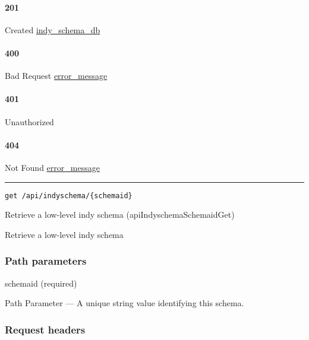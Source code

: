 \hypertarget{section-147}{%
\paragraph{201}\label{section-147}}

Created \protect\hyperlink{indy_schema_db}{indy\_schema\_db}

\hypertarget{section-148}{%
\paragraph{400}\label{section-148}}

Bad Request \protect\hyperlink{error_message}{error\_message}

\hypertarget{section-149}{%
\paragraph{401}\label{section-149}}

Unauthorized \protect\hyperlink{}{}

\hypertarget{section-150}{%
\paragraph{404}\label{section-150}}

Not Found \protect\hyperlink{error_message}{error\_message}

\begin{center}\rule{0.5\linewidth}{\linethickness}\end{center}

\protect\hypertarget{apiIndyschemaSchemaidGet}{}{}

\begin{verbatim}
get /api/indyschema/{schemaid}
\end{verbatim}

Retrieve a low-level indy schema ({apiIndyschemaSchemaidGet})

Retrieve a low-level indy schema

\hypertarget{path-parameters-23}{%
\subsubsection{Path parameters}\label{path-parameters-23}}

schemaid (required)

{Path Parameter} --- A unique string value identifying this schema.

\hypertarget{request-headers-23}{%
\subsubsection{Request headers}\label{request-headers-23}}

